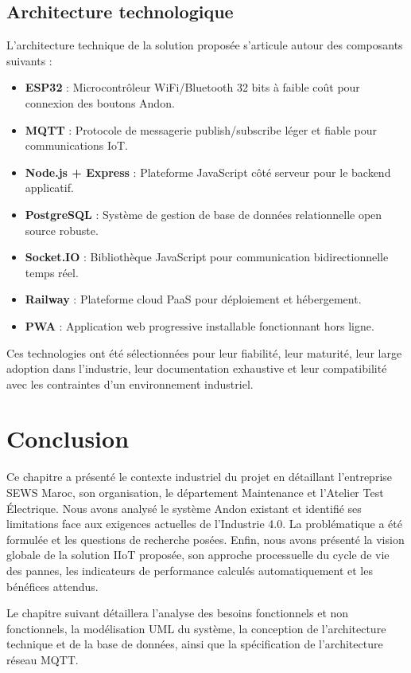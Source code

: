 \subsection{Architecture technologique}

L'architecture technique de la solution proposée s'articule autour des composants suivants :

\begin{itemize}
    \item \textbf{ESP32} : Microcontrôleur WiFi/Bluetooth 32 bits à faible coût pour connexion des boutons Andon.
    \item \textbf{MQTT} : Protocole de messagerie publish/subscribe léger et fiable pour communications IoT\cite{mqtt_iot}.
    \item \textbf{Node.js + Express} : Plateforme JavaScript côté serveur pour le backend applicatif\cite{nodejs_docs}.
    \item \textbf{PostgreSQL} : Système de gestion de base de données relationnelle open source robuste\cite{postgresql_docs}.
    \item \textbf{Socket.IO} : Bibliothèque JavaScript pour communication bidirectionnelle temps réel\cite{socketio_docs}.
    \item \textbf{Railway} : Plateforme cloud PaaS pour déploiement et hébergement\cite{railway_platform}.
    \item \textbf{PWA} : Application web progressive installable fonctionnant hors ligne\cite{pwa_standard}.
\end{itemize}

Ces technologies ont été sélectionnées pour leur fiabilité, leur maturité, leur large adoption dans l'industrie, leur documentation exhaustive et leur compatibilité avec les contraintes d'un environnement industriel.

\section*{Conclusion}

Ce chapitre a présenté le contexte industriel du projet en détaillant l'entreprise SEWS Maroc, son organisation, le département Maintenance et l'Atelier Test Électrique. Nous avons analysé le système Andon existant et identifié ses limitations face aux exigences actuelles de l'Industrie 4.0. La problématique a été formulée et les questions de recherche posées. Enfin, nous avons présenté la vision globale de la solution IIoT proposée, son approche processuelle du cycle de vie des pannes, les indicateurs de performance calculés automatiquement et les bénéfices attendus.

Le chapitre suivant détaillera l'analyse des besoins fonctionnels et non fonctionnels, la modélisation UML du système, la conception de l'architecture technique et de la base de données, ainsi que la spécification de l'architecture réseau MQTT.

\clearpage
